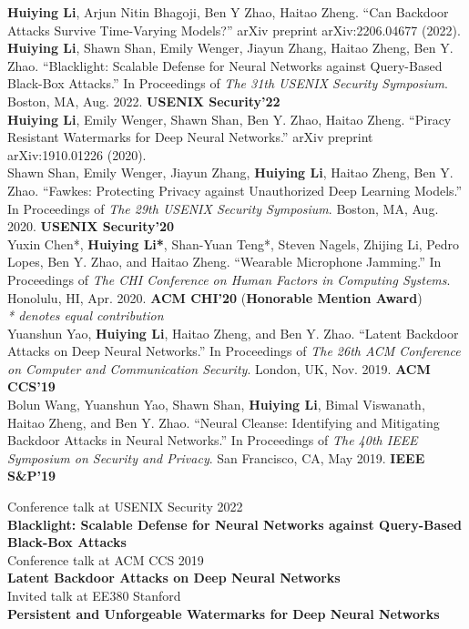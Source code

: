 \documentclass[10pt,letterpaper]{article}
\newenvironment{cvsec}[1]{\par\vspace{10pt}\begin{list}{}{\setlength{\leftmargin}{1.15in}\setlength{\labelwidth}{1.1in}\setlength{\labelsep}{0.05in}\setlength{\topsep}{0pt}}\item[{\parbox[t]{1.1in}{\raggedright\textsc{#1}}}]}{\end{list}}
\newcommand{\me}{\textbf{Huiying Li}}
\begin{document}
\begin{cvsec}{Publication}
\me, Arjun Nitin Bhagoji, Ben Y Zhao, Haitao Zheng. ``Can Backdoor Attacks Survive Time-Varying Models?'' arXiv preprint arXiv:2206.04677 (2022).\\[8pt]
\me, Shawn Shan, Emily Wenger, Jiayun Zhang, Haitao Zheng, Ben Y. Zhao. ``Blacklight: Scalable Defense for Neural Networks against Query-Based Black-Box Attacks.'' In Proceedings of \textit{The 31th USENIX Security Symposium}. Boston, MA, Aug. 2022. \textbf{USENIX Security'22}\\[8pt]
\me, Emily Wenger, Shawn Shan, Ben Y. Zhao, Haitao Zheng. ``Piracy Resistant Watermarks for Deep Neural Networks.'' arXiv preprint arXiv:1910.01226 (2020).\\[8pt]
Shawn Shan, Emily Wenger, Jiayun Zhang, \me, Haitao Zheng, Ben Y. Zhao. ``Fawkes: Protecting Privacy against Unauthorized Deep Learning Models.'' In Proceedings of \textit{The 29th USENIX Security Symposium}. Boston, MA, Aug. 2020. \textbf{USENIX Security'20}\\[8pt]
Yuxin Chen*, \textbf{Huiying Li*}, Shan-Yuan Teng*, Steven Nagels, Zhijing Li, Pedro Lopes, Ben Y. Zhao, and Haitao Zheng. ``Wearable Microphone Jamming.'' In Proceedings of \textit{The CHI Conference on Human Factors in Computing Systems}. Honolulu, HI, Apr. 2020. \textbf{ACM CHI'20} (\textbf{Honorable Mention Award})\\
\textit{* denotes equal contribution}\\[8pt]
Yuanshun Yao, \me, Haitao Zheng, and Ben Y. Zhao. ``Latent Backdoor Attacks on Deep Neural Networks.'' In Proceedings of \textit{The 26th ACM Conference on Computer and Communication Security}. London, UK, Nov. 2019. \textbf{ACM CCS'19}\\[8pt]
Bolun Wang, Yuanshun Yao, Shawn Shan, \me, Bimal Viswanath, Haitao Zheng, and Ben Y. Zhao. ``Neural Cleanse: Identifying and Mitigating Backdoor Attacks in Neural Networks.'' In Proceedings of \textit{The 40th IEEE Symposium on Security and Privacy}. San Francisco, CA, May 2019. \textbf{IEEE S\&P'19}
\end{cvsec}

\begin{cvsec}{Talks}
Conference talk at USENIX Security 2022\\
\textbf{Blacklight: Scalable Defense for Neural Networks against Query-Based Black-Box Attacks}\\[8pt]
Conference talk at ACM CCS 2019\\
\textbf{Latent Backdoor Attacks on Deep Neural Networks}\\[8pt]
Invited talk at EE380 Stanford\\
\textbf{Persistent and Unforgeable Watermarks for Deep Neural Networks}
\end{cvsec}
\end{document}
